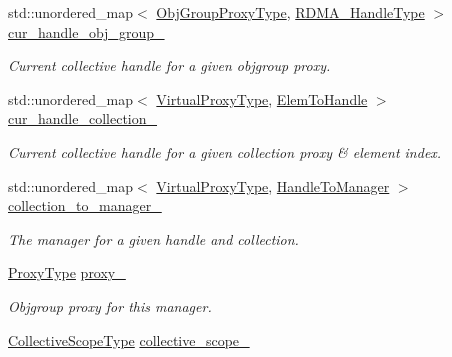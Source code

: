 \begin{DoxyCompactItemize}
\item 
std\+::unordered\+\_\+map$<$ \hyperlink{namespacevt_ad7cae989df485fccca57f0792a880a8e}{Obj\+Group\+Proxy\+Type}, \hyperlink{namespacevt_a10442579ec4e7ebef223818e64bcf908}{R\+D\+M\+A\+\_\+\+Handle\+Type} $>$ \hyperlink{structvt_1_1rdma_1_1_manager_a1aa2e20b7843cdc8efeddda319195113}{cur\+\_\+handle\+\_\+obj\+\_\+group\+\_\+}
\begin{DoxyCompactList}\small\item\em Current collective handle for a given objgroup proxy. \end{DoxyCompactList}\item 
std\+::unordered\+\_\+map$<$ \hyperlink{namespacevt_a1b417dd5d684f045bb58a0ede70045ac}{Virtual\+Proxy\+Type}, \hyperlink{structvt_1_1rdma_1_1_manager_ad794893058cec7595bc2bcb466ce7d3f}{Elem\+To\+Handle} $>$ \hyperlink{structvt_1_1rdma_1_1_manager_adde6a1913c6089be9439b5833489a66c}{cur\+\_\+handle\+\_\+collection\+\_\+}
\begin{DoxyCompactList}\small\item\em Current collective handle for a given collection proxy \& element index. \end{DoxyCompactList}\item 
std\+::unordered\+\_\+map$<$ \hyperlink{namespacevt_a1b417dd5d684f045bb58a0ede70045ac}{Virtual\+Proxy\+Type}, \hyperlink{structvt_1_1rdma_1_1_manager_aac6e7c58d320c302ea08461941d65f6e}{Handle\+To\+Manager} $>$ \hyperlink{structvt_1_1rdma_1_1_manager_ae579c90339a37d953a57dc942ff5f6d1}{collection\+\_\+to\+\_\+manager\+\_\+}
\begin{DoxyCompactList}\small\item\em The manager for a given handle and collection. \end{DoxyCompactList}\item 
\hyperlink{structvt_1_1rdma_1_1_manager_a75d5cdc6428ea19f5ec665b04dcd7166}{Proxy\+Type} \hyperlink{structvt_1_1rdma_1_1_manager_a033b59b7b1ecdf7e813d2999c03134cb}{proxy\+\_\+}
\begin{DoxyCompactList}\small\item\em Objgroup proxy for this manager. \end{DoxyCompactList}\item 
\hyperlink{structvt_1_1rdma_1_1_manager_a7a5509b81547110f71aa85027520cfd5}{Collective\+Scope\+Type} \hyperlink{structvt_1_1rdma_1_1_manager_ad82ac94d4020fbdba45ee4bb8b69b7eb}{collective\+\_\+scope\+\_\+}
\end{DoxyCompactItemize}
